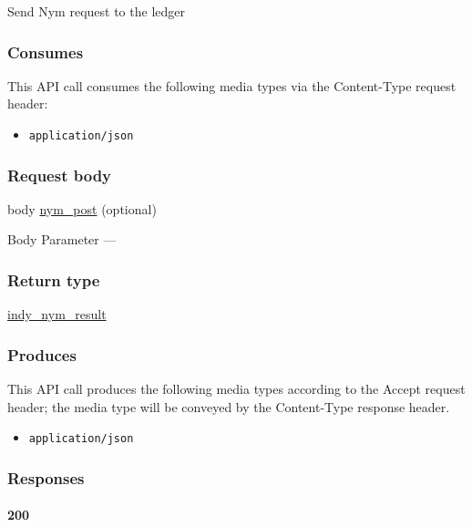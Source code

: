 Send Nym request to the ledger

\hypertarget{consumes-45}{%
\subsubsection{Consumes}\label{consumes-45}}

This API call consumes the following media types via the {Content-Type}
request header:

\begin{itemize}
\tightlist
\item
  \texttt{application/json}
\end{itemize}

\hypertarget{request-body-45}{%
\subsubsection{Request body}\label{request-body-45}}

body \protect\hyperlink{nym_post}{nym\_post} (optional)

{Body Parameter} ---

\hypertarget{return-type-111}{%
\subsubsection{Return type}\label{return-type-111}}

\protect\hyperlink{indy_nym_result}{indy\_nym\_result}

\hypertarget{produces-142}{%
\subsubsection{Produces}\label{produces-142}}

This API call produces the following media types according to the
{Accept} request header; the media type will be conveyed by the
{Content-Type} response header.

\begin{itemize}
\tightlist
\item
  \texttt{application/json}
\end{itemize}

\hypertarget{responses-147}{%
\subsubsection{Responses}\label{responses-147}}

\hypertarget{section-471}{%
\paragraph{200}\label{section-471}}

